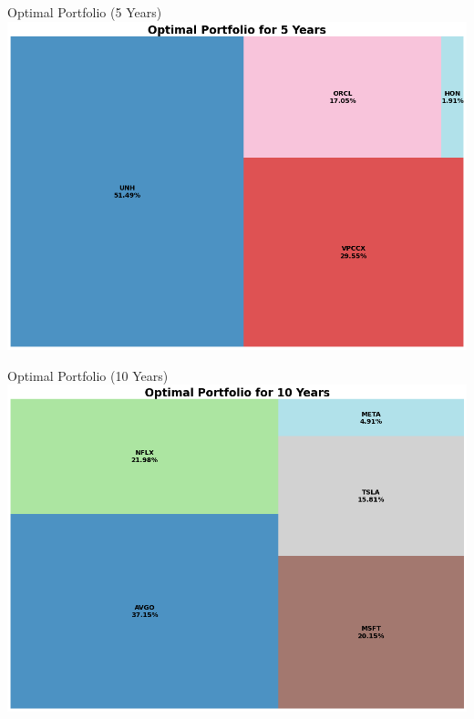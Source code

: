 \documentclass{beamer}
\begin{document}
\begin{frame}{Optimal Portfolio (5 Years)}
    \centering
    \includegraphics[height=0.8\textheight]{optimal_portfolio_5_years.png}
\end{frame}

\begin{frame}{Optimal Portfolio (10 Years)}
    \centering
    \includegraphics[height=0.8\textheight]{optimal_portfolio_10_years.png}
\end{frame}
\end{document}
